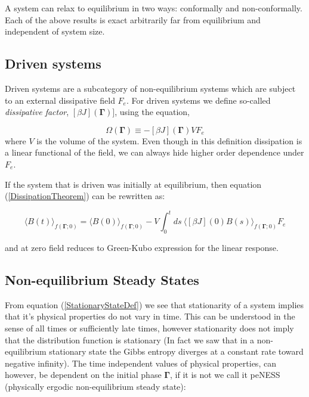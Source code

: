 \documentclass[a4paper,12pt,nofootinbib]{article}
\begin{document}
A system can relax to equilibrium in two ways: conformally and non-conformally.
Each of the above results is exact arbitrarily far from equilibrium and independent of system size.

\subsection{Driven systems}

Driven systems are a subcategory of non-equilibrium systems which are subject to an external dissipative field $F_e$.
For driven systems we define so-called \textit{dissipative factor}, $[\beta J](\bm{\Gamma})]$, using the equation,

\begin{equation}
\label{primaryDissipationFunction}
  \Omega(\bm{\Gamma})\equiv -[\beta J](\bm{\Gamma})V F_e
\end{equation}
where $V$ is the volume of the system.
Even though in this definition dissipation is a linear functional of the field, we can always hide higher order dependence under $F_e$.

If the system that is driven was initially at equilibrium, then equation (\ref{DissipationTheorem}) can be rewritten as:

\begin{equation}
  \langle B(t) \rangle_{f(\bm{\Gamma};0)}=\langle B(0) \rangle_{f(\bm{\Gamma};0)} - V \int_0^t ds\ \langle[\beta J](0)B(s)\rangle_{f(\bm{\Gamma};0)} F_e
\end{equation}

and at zero field reduces to Green-Kubo expression for the linear response.


\subsection{Non-equilibrium Steady States}

From equation (\ref{StationaryStateDef}) we see that stationarity of a system implies that it's physical properties do not vary in time. This can be understood in the sense of all times or sufficiently late times, however stationarity does not imply that the distribution function is stationary (In fact we saw that in a non-equilibrium stationary state the Gibbs entropy diverges at a constant rate toward negative infinity).
The time independent values of physical properties, can however, be dependent on the initial phase $\bm{\Gamma}$, if it is not we call it peNESS (physically ergodic non-equilibrium steady state):
\end{document}
